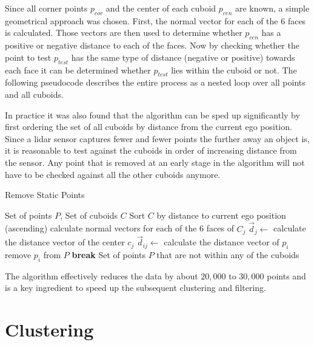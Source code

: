 
Since all corner points $p_{cor}$ and the center of each cuboid $p_{cen}$ are known, a simple geometrical approach was chosen. First, the normal vector for each of the 6 faces is calculated. Those vectors are then used to determine whether $p_{cen}$ has a positive or negative distance to each of the faces. Now by checking whether the point to test $p_{test}$ has the same type of distance (negative or positive) towards each face it can be determined whether $p_{test}$ lies within the cuboid or not. The following pseudocode describes the entire process as a nested loop over all points and all cuboids.

In practice it was also found that the algorithm can be sped up significantly by first ordering the set of all cuboids by distance from the current ego position. Since a lidar sensor captures fewer and fewer points the further away an object is, it is reasonable to test against the cuboids in order of increasing distance from the sensor. Any point that is removed at an early stage in the algorithm will not have to be checked against all the other cuboids anymore.

\begin{algorithm}[H]
\caption{Remove Static Points}\label{static_point}
\begin{algorithmic}
\Input Set of points $P$, Set of cuboids $C$
\Init Sort $C$ by distance to current ego position (ascending)
\State calculate normal vectors for each of the 6 faces of $C_j$ 
\State $\vec{d}_j \leftarrow$ calculate the distance vector of the center $c_j$
\EndFor
{} 
\State $\vec{d}_{ij} \leftarrow$ calculate the distance vector of $p_i$
\State remove $p_i$ from $P$
\State \textbf{break}
\EndIf
\EndFor
\EndFor
\Output Set of points $P$ that are not within any of the cuboids
\end{algorithmic}
\end{algorithm}

The algorithm effectively reduces the data by about $20,000$ to $30,000$ points and is a key ingredient to speed up the subsequent clustering and filtering.

\section{Clustering}

